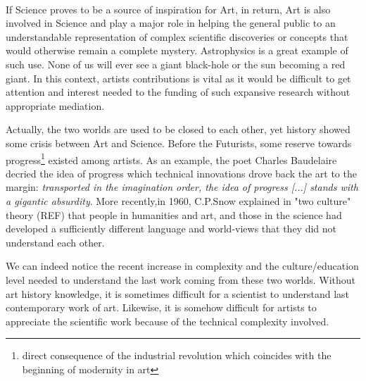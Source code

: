 \begin{figure}[!t]
\centering
    \\
    \hfil
    \caption{}
    \label{fig:chronophotography_history}
\end{figure}


If Science proves to be a source of inspiration for Art, in return, Art is also involved in Science and play a major role in helping the general public to an understandable representation of complex scientific discoveries or concepts that would otherwise remain a complete mystery. Astrophysics is a great example of such use. None of us will ever see a giant black-hole or the sun becoming a red giant. In this context, artists contributions is vital as it would be difficult to get attention and interest needed to the funding of such expansive research without appropriate mediation.


Actually, the two worlds are used to be closed to each other, yet history showed some crisis between Art and Science. Before the Futurists, some reserve towards progress\footnote{direct consequence of the industrial revolution which coincides with the beginning of modernity in art} existed among artists. As an example, the poet Charles Baudelaire decried the idea of progress which technical innovations drove back the art to the margin: \emph{transported in the imagination order, the idea of progress [...] stands with a gigantic absurdity}. More recently,in 1960, C.P.Snow explained in "two culture" theory (REF) that people in humanities and art, and those in the science had developed a sufficiently different language and world-views that they did not understand each other.

We can indeed notice the recent increase in complexity and the culture/education level needed to understand the last work coming from these two worlds. Without art history knowledge, it is sometimes difficult for a scientist to understand last contemporary work of art. Likewise, it is somehow difficult for artists to appreciate the scientific work because of the technical complexity involved.

